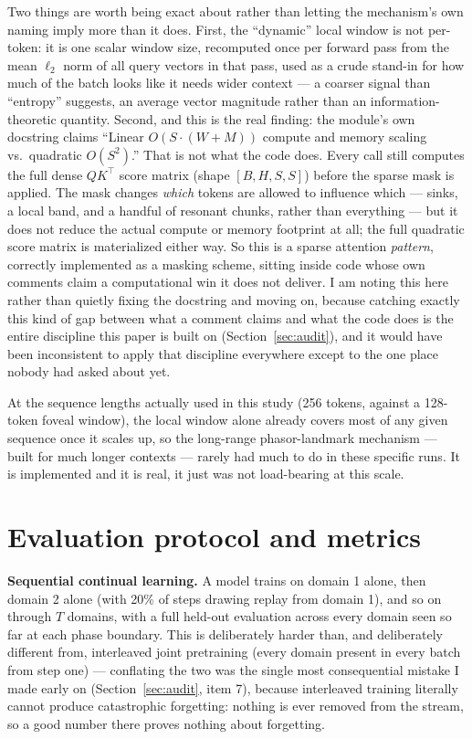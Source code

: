 \documentclass[11pt,letterpaper]{article}
\begin{document}
Two things are worth being exact about rather than letting the mechanism's own naming imply more than it does. First, the ``dynamic'' local window is not per-token: it is one scalar window size, recomputed once per forward pass from the mean $\ell_2$ norm of all query vectors in that pass, used as a crude stand-in for how much of the batch looks like it needs wider context --- a coarser signal than ``entropy'' suggests, an average vector magnitude rather than an information-theoretic quantity. Second, and this is the real finding: the module's own docstring claims ``Linear $O(S\cdot(W+M))$ compute and memory scaling vs.\ quadratic $O(S^2)$.'' That is not what the code does. Every call still computes the full dense $QK^\top$ score matrix (shape $[B,H,S,S]$) before the sparse mask is applied. The mask changes \emph{which} tokens are allowed to influence which --- sinks, a local band, and a handful of resonant chunks, rather than everything --- but it does not reduce the actual compute or memory footprint at all; the full quadratic score matrix is materialized either way. So this is a sparse attention \emph{pattern}, correctly implemented as a masking scheme, sitting inside code whose own comments claim a computational win it does not deliver. I am noting this here rather than quietly fixing the docstring and moving on, because catching exactly this kind of gap between what a comment claims and what the code does is the entire discipline this paper is built on (Section~\ref{sec:audit}), and it would have been inconsistent to apply that discipline everywhere except to the one place nobody had asked about yet.

At the sequence lengths actually used in this study (256 tokens, against a 128-token foveal window), the local window alone already covers most of any given sequence once it scales up, so the long-range phasor-landmark mechanism --- built for much longer contexts --- rarely had much to do in these specific runs. It is implemented and it is real, it just was not load-bearing at this scale.

\section{Evaluation protocol and metrics}
\label{sec:protocol}

\textbf{Sequential continual learning.} A model trains on domain 1 alone, then domain 2 alone (with 20\% of steps drawing replay from domain 1), and so on through $T$ domains, with a full held-out evaluation across every domain seen so far at each phase boundary. This is deliberately harder than, and deliberately different from, interleaved joint pretraining (every domain present in every batch from step one) --- conflating the two was the single most consequential mistake I made early on (Section~\ref{sec:audit}, item 7), because interleaved training literally cannot produce catastrophic forgetting: nothing is ever removed from the stream, so a good number there proves nothing about forgetting.
\end{document}
